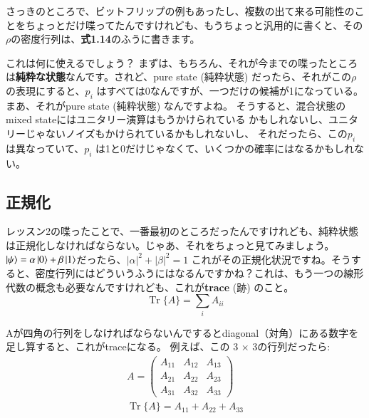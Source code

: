 さっきのところで、ビットフリップの例もあったし、複数の出て来る可能性のことをちょっとだけ喋ってたんですけれども、もうちょっと汎用的に書くと、その$\rho$の密度行列は、\textbf{式1.14}のふうに書きます。

これは何に使えるでしょう？
まずは、もちろん、それが今までの喋ったところは\textbf{純粋な状態}なんです。されど、pure state (純粋状態) だったら、それがこの$\rho$の表現にすると、$p_i$ はすべては0なんですが、一つだけの候補が1になっている。まあ、それがpure state (純粋状態) なんですよね。
そうすると、混合状態のmixed stateにはユニタリー演算はもうかけられている
かもしれないし、ユニタリーじゃないノイズもかけられているかもしれないし、
それだったら、この$p_i$は異なっていて、$p_i$ は1と0だけじゃなくて、いくつかの確率にはなるかもしれない。
\subsection{正規化}
レッスン2の喋ったことで、一番最初のところだったんですけれども、純粋状態は正規化しなければならない。じゃあ、それをちょっと見てみましょう。
$\ket{\psi}=\alpha\ket{0}+\beta\ket{1}$だったら、$|\alpha|^2+|\beta|^2=1$
これがその正規化状況ですね。そうすると、密度行列にはどういうふうにはなるんですかね？これは、もう一つの線形代数の概念も必要なんですけれども、これが\textbf{trace} (跡) のこと。
\begin{equation}
\operatorname{Tr}\{A\}=\sum_{i} A_{i i}
\end{equation}

Aが四角の行列をしなければならないんでするとdiagonal（対角）にある数字を足し算すると、これがtraceになる。
例えば、この 3 × 3の行列だったら:
\begin{equation}
\begin{gathered}
A=\left(\begin{array}{ccc}
A_{11} & A_{12} & A_{13} \\
A_{21} & A_{22} & A_{23} \\
A_{31} & A_{32} & A_{33}
\end{array}\right) \\
\operatorname{Tr}\{A\}=A_{11}+A_{22}+A_{33}
\end{gathered}
\end{equation}

